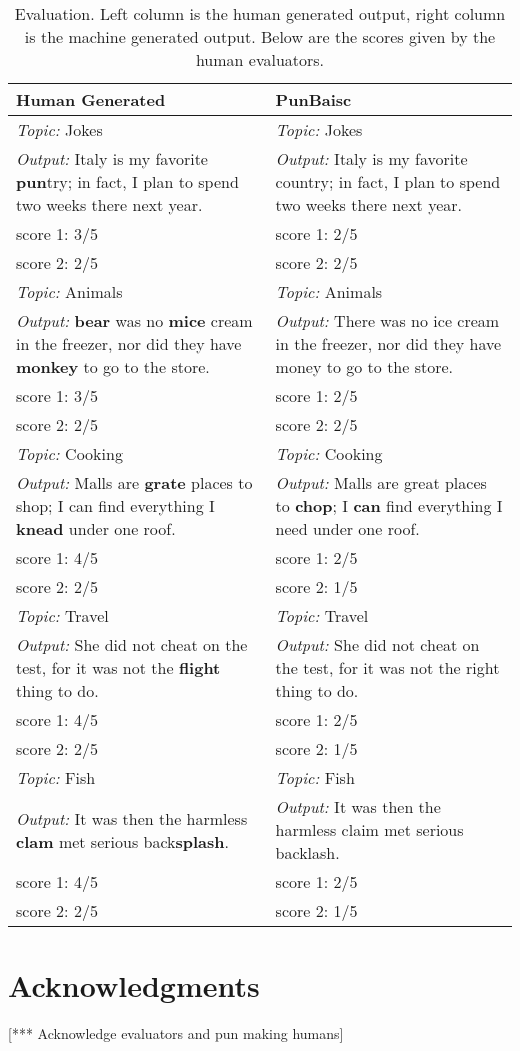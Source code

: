 \documentclass[11pt,letterpaper]{article}
\begin{document}
\begin{table}
  \centering
  \begin{tabular}{|P{7cm}|P{7cm}|}
    \hline
    Human Generated         & PunBaisc              \\ \hline
    \textit{Topic:} Jokes   & \textit{Topic:} Jokes \\
    \textit{Output:} Italy is my favorite \textbf{pun}try; in fact, I plan to spend two weeks there next year. & \textit{Output:} Italy is my favorite country; in fact, I plan to spend two weeks there next year. \\
    score 1: 3/5            & score 1: 2/5\\
    score 2: 2/5            & score 2: 2/5          \\ \hline
    \textit{Topic:} Animals   & \textit{Topic:} Animals \\
    \textit{Output:} \textbf{bear} was no \textbf{mice} cream in the freezer, nor did they have \textbf{monkey} to go to the store. & \textit{Output:} There was no ice cream in the freezer, nor did they have money to go to the store. \\
    score 1: 3/5            & score 1: 2/5\\
    score 2: 2/5            & score 2: 2/5          \\ \hline
    \textit{Topic:} Cooking   & \textit{Topic:} Cooking \\
    \textit{Output:} Malls are \textbf{grate} places to shop; I can find everything I \textbf{knead} under one roof. & \textit{Output:} Malls are great places to \textbf{chop}; I \textbf{can} find everything I need under one roof. \\
    score 1: 4/5            & score 1: 2/5\\
    score 2: 2/5            & score 2: 1/5          \\ \hline
    \textit{Topic:} Travel   & \textit{Topic:} Travel \\
    \textit{Output:} She did not cheat on the test, for it was not the \textbf{flight} thing to do. & \textit{Output:} She did not cheat on the test, for it was not the right thing to do. \\
    score 1: 4/5            & score 1: 2/5\\
    score 2: 2/5            & score 2: 1/5          \\ \hline
    \textit{Topic:} Fish  & \textit{Topic:} Fish \\
    \textit{Output:} It was then the harmless \textbf{clam} met serious back\textbf{splash}. & \textit{Output:} It was then the harmless claim met serious backlash. \\
    score 1: 4/5            & score 1: 2/5\\
    score 2: 2/5            & score 2: 1/5          \\ \hline
  \end{tabular}
  \newline\newline
  \caption{Evaluation. Left column is the human generated output, right column is the machine generated output. Below are the scores given by the human evaluators.}\label{tab1}
\end{table}

\section*{Acknowledgments} 
[*** Acknowledge evaluators and pun making humans]



\end{document}
